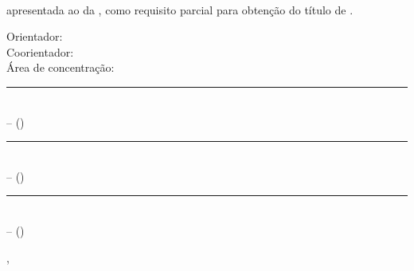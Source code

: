 \thispagestyle{empty}
\begin{center}
  \por{}%
\end{center}
\vfill %
\begin{center}
  \textbf{\monog{}}\\ %
  \textbf{\subtitulo{}} %
\end{center}
\vfill %
\begin{flushright}
  \begin{minipage}{9cm} %
    {\tipo{} apresentada ao \curso{} da \univ{}, como requisito parcial para obtenção do título de \grau{}.} \par{} %
    \vspace{1cm}
    Orientador: {\profOrientador{}} \\ %
    Coorientador: {\profA{}} \\
    \bigskip
    Área de concentração: {\areaConcentracao{}}
  \end{minipage}
\end{flushright}

\vfill %


\begin{center}
	\rule{8cm}{0.01cm}\\ %
	\profOrientador -- \ProfOrientadorInstituicao (\ProfOrientadorStatus) %
\end{center}
	
\vfill %
	
\begin{center}
	\rule{8cm}{0.01cm}\\  %
	\profA -- \ProfAInstituicao (\ProfAStatus) %
\end{center}
	
\vfill %
	
\begin{center}
	\rule{8cm}{0.01cm}\\ %
	\profB -- \ProfBInstituicao (\ProfBStatus) %
\end{center}

\vfill %

\begin{center}
  \cidade, \dataCompleta %
\end{center}

